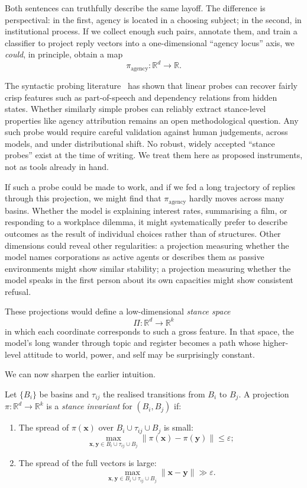 \documentclass[12pt,a4paper]{article}
\begin{document}
Both sentences can truthfully describe the same layoff. The difference is perspectival: in the first, agency is located in a choosing subject; in the second, in institutional process. If we collect enough such pairs, annotate them, and train a classifier to project reply vectors into a one-dimensional ``agency locus'' axis, we \emph{could}, in principle, obtain a map
\[
\pi_{\text{agency}} : \mathbb{R}^d \to \mathbb{R}.
\]

The syntactic probing literature~\cite{belinkov_glass, hewitt_manning} has shown that linear probes can recover fairly crisp features such as part-of-speech and dependency relations from hidden states. Whether similarly simple probes can reliably extract stance-level properties like agency attribution remains an open methodological question. Any such probe would require careful validation against human judgements, across models, and under distributional shift. No robust, widely accepted ``stance probes'' exist at the time of writing. We treat them here as proposed instruments, not as tools already in hand.

If such a probe could be made to work, and if we fed a long trajectory of replies through this projection, we might find that $\pi_{\text{agency}}$ hardly moves across many basins. Whether the model is explaining interest rates, summarising a film, or responding to a workplace dilemma, it might systematically prefer to describe outcomes as the result of individual choices rather than of structures. Other dimensions could reveal other regularities: a projection measuring whether the model names corporations as active agents or describes them as passive environments might show similar stability; a projection measuring whether the model speaks in the first person about its own capacities might show consistent refusal.

These projections would define a low-dimensional \emph{stance space}
\[
\Pi : \mathbb{R}^d \to \mathbb{R}^k
\]
in which each coordinate corresponds to such a gross feature. In that space, the model's long wander through topic and register becomes a path whose higher-level attitude to world, power, and self may be surprisingly constant.

We can now sharpen the earlier intuition.

\begin{formalbox}[title={Stance invariants on routes}]
Let $\{B_i\}$ be basins and $\tau_{ij}$ the realised transitions from $B_i$ to $B_j$. A projection $\pi : \mathbb{R}^d \to \mathbb{R}^k$ is a \emph{stance invariant} for $(B_i,B_j)$ if:
\begin{enumerate}
  \item The spread of $\pi(\mathbf{x})$ over $B_i \cup \tau_{ij} \cup B_j$ is small:
  \[
  \max_{\mathbf{x},\mathbf{y} \in B_i \cup \tau_{ij} \cup B_j} \|\pi(\mathbf{x}) - \pi(\mathbf{y})\| \le \varepsilon;
  \]
  \item The spread of the full vectors is large:
  \[
  \max_{\mathbf{x},\mathbf{y} \in B_i \cup \tau_{ij} \cup B_j} \|\mathbf{x} - \mathbf{y}\| \gg \varepsilon.
  \]
\end{enumerate}
\end{formalbox}
\end{document}
